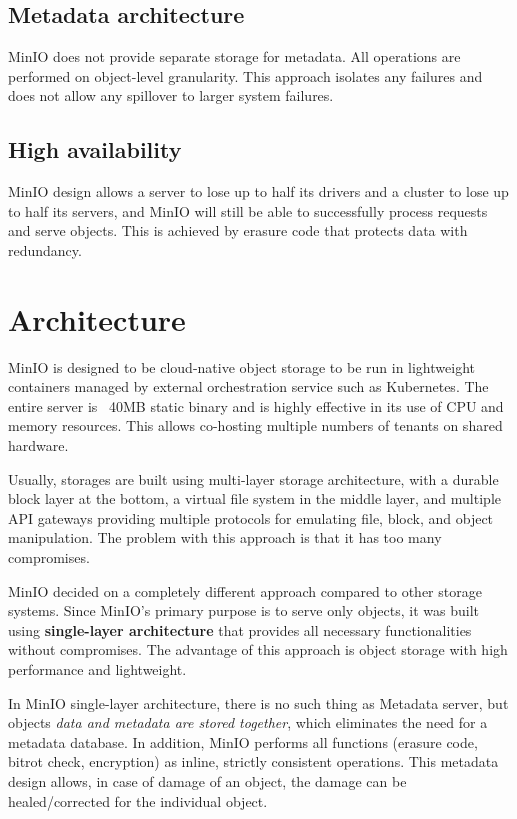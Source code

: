     \subsection*{Metadata architecture}
    MinIO does not provide separate storage for metadata. All operations are performed on object-level granularity. This approach isolates any failures and does not allow any spillover to larger system failures\cite{minioIntel}.

    \subsection*{High availability}
    MinIO design allows a server to lose up to half its drivers and a cluster to lose up to half its servers, and MinIO will still be able to successfully process requests and serve objects. This is achieved by erasure code that protects data with redundancy\cite{minioIntel}.

    \section{Architecture}
    MinIO is designed to be cloud-native object storage to be run in lightweight containers managed by external orchestration service such as Kubernetes. The entire server is ~40MB static binary and is highly effective in its use of CPU and memory resources. This allows co-hosting multiple numbers of tenants on shared hardware\cite{minioObjectStorage}.

    Usually, storages are built using multi-layer storage architecture, with a durable block layer at the bottom, a virtual file system in the middle layer, and multiple API gateways providing multiple protocols for emulating file, block, and object manipulation. The problem with this approach is that it has too many compromises\cite{minioIntel}.

    MinIO decided on a completely different approach compared to other storage systems. Since MinIO's primary purpose is to serve only objects, it was built using \textbf{single-layer architecture} that provides all necessary functionalities without compromises. The advantage of this approach is object storage with high performance and lightweight\cite{minioIntel}.

    In MinIO single-layer architecture, there is no such thing as Metadata server, but objects \textit{data and metadata are stored together}, which eliminates the need for a metadata database. In addition, MinIO performs all functions (erasure code, bitrot check, encryption) as inline, strictly consistent operations. This metadata design allows, in case of damage of an object, the damage can be healed/corrected for the individual object\cite{minioHighPerformance}.

